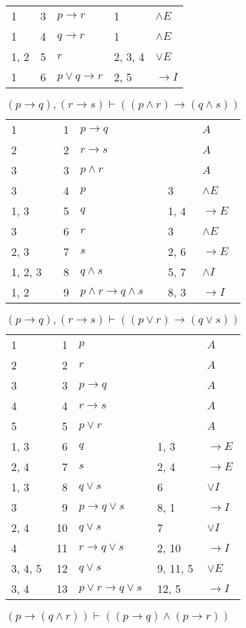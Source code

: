 \documentclass{article}
\begin{document}
\begin{table}[htbp]
\begin{tabular}{lrlll}
{1} & 3 & $p→r$ & {1} & $∧E$ \\
{1} & 4 & $q→r$ & {1} & $∧E$ \\
{1, 2} & 5 & $r$ & {2, 3, 4} & $∨E$ \\
{1} & 6 & $p∨q→r$ & {2, 5} & $→I$ \\
\end{tabular}
\end{table}\begin{table}[htbp]\caption*{$(p→q),(r→s) ⊢ ((p∧r)→(q∧s))$}\centering\begin{tabular}{lrlll}
{1} & 1 & $p→q$ & {} & $A$ \\
{2} & 2 & $r→s$ & {} & $A$ \\
{3} & 3 & $p∧r$ & {} & $A$ \\
{3} & 4 & $p$ & {3} & $∧E$ \\
{1, 3} & 5 & $q$ & {1, 4} & $→E$ \\
{3} & 6 & $r$ & {3} & $∧E$ \\
{2, 3} & 7 & $s$ & {2, 6} & $→E$ \\
{1, 2, 3} & 8 & $q∧s$ & {5, 7} & $∧I$ \\
{1, 2} & 9 & $p∧r→q∧s$ & {8, 3} & $→I$ \\
\end{tabular}
\end{table}\begin{table}[htbp]\caption*{$(p→q),(r→s) ⊢ ((p∨r)→(q∨s))$}\centering\begin{tabular}{lrlll}
{1} & 1 & $p$ & {} & $A$ \\
{2} & 2 & $r$ & {} & $A$ \\
{3} & 3 & $p→q$ & {} & $A$ \\
{4} & 4 & $r→s$ & {} & $A$ \\
{5} & 5 & $p∨r$ & {} & $A$ \\
{1, 3} & 6 & $q$ & {1, 3} & $→E$ \\
{2, 4} & 7 & $s$ & {2, 4} & $→E$ \\
{1, 3} & 8 & $q∨s$ & {6} & $∨I$ \\
{3} & 9 & $p→q∨s$ & {8, 1} & $→I$ \\
{2, 4} & 10 & $q∨s$ & {7} & $∨I$ \\
{4} & 11 & $r→q∨s$ & {2, 10} & $→I$ \\
{3, 4, 5} & 12 & $q∨s$ & {9, 11, 5} & $∨E$ \\
{3, 4} & 13 & $p∨r→q∨s$ & {12, 5} & $→I$ \\
\end{tabular}
\end{table}\begin{table}[htbp]\caption*{$(p→(q∧r)) ⊢ ((p→q)∧(p→r))$}\centering\begin{tabular}{lrlll}

\end{tabular}
\end{table}
\end{document}
